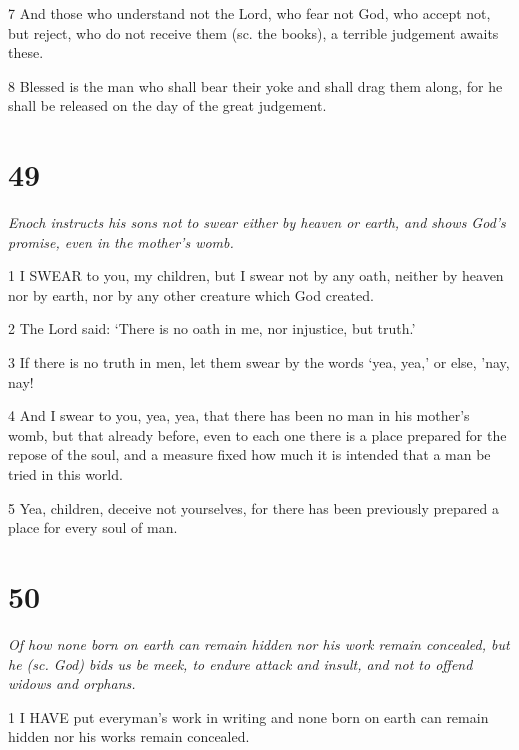 \par 7 And those who understand not the Lord, who fear not God, who accept not, but reject, who do not receive them (sc. the books), a terrible judgement awaits these.

\par 8 Blessed is the man who shall bear their yoke and shall drag them along, for he shall be released on the day of the great judgement.

\chapter{49}

\par \textit{Enoch instructs his sons not to swear either by heaven or earth, and shows God's promise, even in the mother's womb.}

\par 1 I SWEAR to you, my children, but I swear not by any oath, neither by heaven nor by earth, nor by any other creature which God created.

\par 2 The Lord said: ‘There is no oath in me, nor injustice, but truth.’

\par 3 If there is no truth in men, let them swear by the words ‘yea, yea,’ or else, 'nay, nay!

\par 4 And I swear to you, yea, yea, that there has been no man in his mother's womb, but that already before, even to each one there is a place prepared for the repose of the soul, and a measure fixed how much it is intended that a man be tried in this world.

\par 5 Yea, children, deceive not yourselves, for there has been previously prepared a place for every soul of man.

\chapter{50}

\par \textit{Of how none born on earth can remain hidden nor his work remain concealed, but he (sc. God) bids us be meek, to endure attack and insult, and not to offend widows and orphans.}

\par 1 I HAVE put everyman's work in writing and none born on earth can remain hidden nor his works remain concealed.


